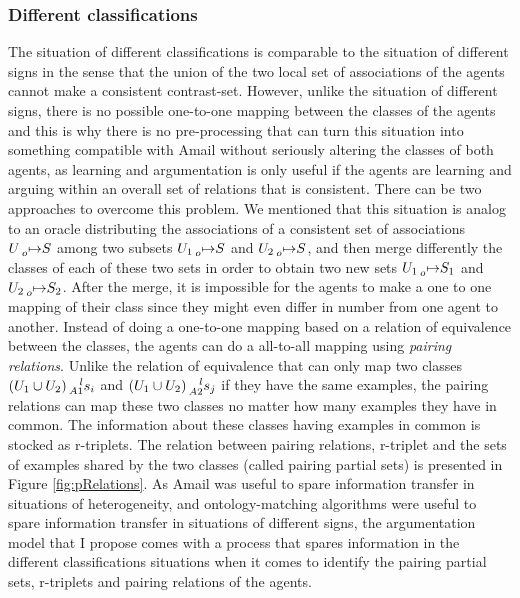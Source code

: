 \subsubsection{Different classifications} The situation of different classifications is comparable to the situation of different signs in the sense that the union of the two local set of associations of the agents cannot make a consistent contrast-set. However, unlike the situation of different signs, there is no possible one-to-one mapping between the classes of the agents and this is why there is no pre-processing that can turn this situation into something compatible with Amail without seriously altering the classes of both agents, as learning and argumentation is only useful if the agents are learning and arguing within an overall set of relations that is consistent. There can be two approaches to overcome this problem.
We mentioned that this situation is analog to an oracle distributing the associations of a consistent set of associations $U \prescript{}{o}{\mapsto} S$ among two subsets $U_{1} \prescript{}{o}{\mapsto} S$ and $U_{2} \prescript{}{o}{\mapsto} S$, and then merge differently the classes of each of these two sets in order to obtain two new sets $U_{1} \prescript{}{o}{\mapsto} S_{1}$ and $U_{2} \prescript{}{o}{\mapsto} S_{2}$.
After the merge, it is impossible for the agents to make a one to one mapping of their class since they might even differ in number from one agent to another. Instead of doing a one-to-one mapping based on a relation of equivalence between the classes, the agents can do a all-to-all mapping using \emph{pairing relations}. Unlike the relation of equivalence that can only map two classes $(U_{1} \cup U_{2}) \prescript{l}{A1}{s_{i}}$ and $(U_{1} \cup U_{2}) \prescript{l}{A2}{s_{j}}$ if they have the same examples, the pairing relations can map these two classes no matter how many examples they have in common. The information about these classes having examples in common is stocked as r-triplets. The relation between pairing relations, r-triplet and the sets of examples shared by the two classes (called pairing partial sets) is presented in Figure \ref{fig:pRelations}. As Amail was useful to spare information transfer in situations of heterogeneity, and ontology-matching algorithms were useful to spare information transfer in situations of different signs, the argumentation model that I propose comes with a process that spares information in the different classifications situations when it comes to identify the pairing partial sets, r-triplets and pairing relations of the agents.
